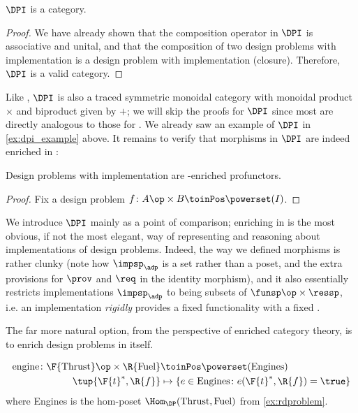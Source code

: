 \begin{lemma}
    $\DPI$ is a category.
\end{lemma}

\begin{proof}
    We have already shown that the composition operator in $\DPI$ is associative and unital, and that the composition of two design problems with implementation is a design problem with implementation (closure). Therefore, $\DPI$ is a valid category.
\end{proof}

Like \DP, $\DPI$ is also a traced symmetric monoidal category with monoidal product $\times$ and biproduct given by $+$; we will skip the proofs for $\DPI$ since most are directly analogous to those for \DP. We already saw an example of $\DPI$ in \cref{ex:dpi_example} above. It remains to verify that morphisms in $\DPI$ are indeed enriched in \Set:

\begin{proposition}
    Design problems with implementation are \Set-enriched profunctors.
\end{proposition}
\begin{proof}
    Fix a design problem $f \colon A\op \times B \toinPos \powerset(I)$.
\end{proof}

We introduce $\DPI$ mainly as a point of comparison; enriching in \Set is the most obvious, if not the most elegant, way of representing and reasoning about implementations of design problems. Indeed, the way we defined morphisms is rather clunky (note how $\impsp_\adp$ is a set rather than a poset, and the extra provisions for $\prov$ and $\req$ in the identity morphism), and it also essentially restricts implementations $\impsp_\adp$ to being subsets of $\funsp\op \times \ressp$, i.e. an implementation \emph{rigidly} provides a fixed functionality \fun with a fixed \res.

The far more natural option, from the perspective of enriched category theory, is to enrich design problems in \DP itself.

\begin{example}
    \begin{equation}
        \begin{aligned}
            \text{engine} \colon \F{\text{Thrust}}\op \times \R{\text{Fuel}} &\toinPos \powerset(\text{Engines}) \\
            \tup{\F{t}^*,\R{f}} &\mapsto \{ e \in \text{Engines} \colon e(\F{t}^*, \R{f}) = \true \}
        \end{aligned}
    \end{equation}
    where Engines is the hom-poset $\Hom_\DP(\text{Thrust}, \text{Fuel})$ from \cref{ex:rdproblem}.
\end{example}

